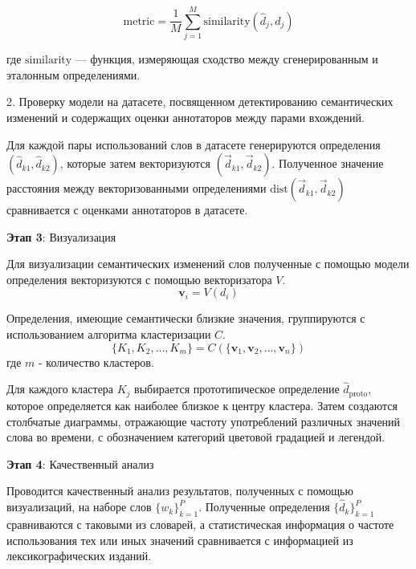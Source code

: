 \documentclass[LI,VKR]{HSEUniversity}
\begin{document}
\[
\text{metric} = \frac{1}{M} \sum_{j=1}^{M} \text{similarity}(\hat{d}_j, d_j)
\]

где \(\text{similarity}\) — функция, измеряющая сходство между сгенерированным и эталонным определениями.

2. Проверку модели на датасете, посвященном детектированию семантических изменений и
содержащих оценки аннотаторов между парами вхождений.

Для каждой пары использований слов в датасете генерируются определения \( (\hat{d}_{k1}, \hat{d}_{k2}) \),
которые затем векторизуются \( (\vec{d}_{k1}, \vec{d}_{k2}) \).
Полученное значение расстояния между векторизованными определениями \( \text{dist}(\vec{d}_{k1}, \vec{d}_{k2}) \)
сравнивается с оценками аннотаторов в датасете.

\textbf{Этап 3}: Визуализация

Для визуализации семантических изменений слов полученные с помощью модели определения векторизуются
с помощью векторизатора \( V \).
   \[
   \mathbf{v}_i = V(d_i)
   \]

Определения, имеющие семантически близкие значения,
группируются с использованием алгоритма кластеризации \( C \).
   \[
   \{K_1, K_2, \ldots, K_m\} = C(\{\mathbf{v}_1, \mathbf{v}_2, \ldots, \mathbf{v}_n\})
   \]
   где \( m \) - количество кластеров.

Для каждого кластера \( K_j \) выбирается прототипическое определение \( \hat{d}_{\text{proto}} \),
которое определяется как наиболее близкое к центру кластера.
Затем создаются столбчатые диаграммы,
отражающие частоту употреблений различных значений слова во времени,
с обозначением категорий цветовой градацией и легендой.

\textbf{Этап 4}: Качественный анализ

Проводится качественный анализ результатов, полученных с помощью визуализаций,
на наборе слов \( \{w_k\}_{k=1}^{P} \).
Полученные определения \( \{\hat{d}_k\}_{k=1}^{P} \) сравниваются с таковыми из словарей,
а статистическая информация о частоте использования тех или иных значений сравнивается
с информацией из лексикографических изданий.
\end{document}
